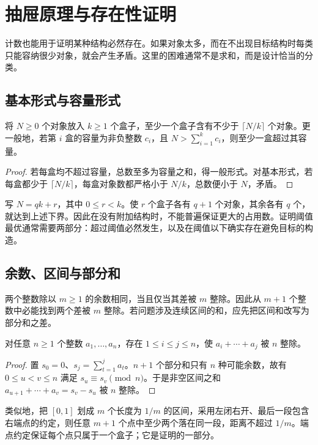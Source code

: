 \documentclass[UTF8,12pt,a4paper,fontset=fandol]{ctexbook}
\begin{document}
\chapter{抽屉原理与存在性证明}
\label{ch:pigeonhole}

计数也能用于证明某种结构必然存在。如果对象太多，而在不出现目标结构时每类只能容纳很少对象，就会产生矛盾。这里的困难通常不是求和，而是设计恰当的分类。

\section{基本形式与容量形式}

\begin{theorem}
将 $N\ge0$ 个对象放入 $k\ge1$ 个盒子，至少一个盒子含有不少于 $\lceil N/k\rceil$ 个对象。更一般地，若第 $i$ 盒的容量为非负整数 $c_i$，且 $N>\sum_{i=1}^k c_i$，则至少一盒超过其容量。
\end{theorem}
\begin{proof}
若每盒均不超过容量，总数至多为容量之和，得一般形式。对基本形式，若每盒都少于 $\lceil N/k\rceil$，每盒对象数都严格小于 $N/k$，总数便小于 $N$，矛盾。
\end{proof}

写 $N=qk+r$，其中 $0\le r<k$。使 $r$ 个盒子各有 $q+1$ 个对象，其余各有 $q$ 个，就达到上述下界。因此在没有附加结构时，不能普遍保证更大的占用数。证明阈值最优通常需要两部分：超过阈值必然发生，以及在阈值以下确实存在避免目标的构造。

\section{余数、区间与部分和}

两个整数除以 $m\ge1$ 的余数相同，当且仅当其差被 $m$ 整除。因此从 $m+1$ 个整数中必能找到两个差被 $m$ 整除。若问题涉及连续区间的和，应先把区间和改写为部分和之差。

\begin{proposition}
对任意 $n\ge1$ 个整数 $a_1,\ldots,a_n$，存在 $1\le i\le j\le n$，使 $a_i+\cdots+a_j$ 被 $n$ 整除。
\end{proposition}
\begin{proof}
置 $s_0=0$、$s_j=\sum_{t=1}^j a_t$。$n+1$ 个部分和只有 $n$ 种可能余数，故有 $0\le u<v\le n$ 满足 $s_u\equiv s_v\pmod n$。于是非空区间之和 $a_{u+1}+\cdots+a_v=s_v-s_u$ 被 $n$ 整除。
\end{proof}

类似地，把 $[0,1]$ 划成 $m$ 个长度为 $1/m$ 的区间，采用左闭右开、最后一段包含右端点的约定，则任意 $m+1$ 个点中至少两个落在同一段，距离不超过 $1/m$。端点约定保证每个点只属于一个盒子；它是证明的一部分。
\end{document}

